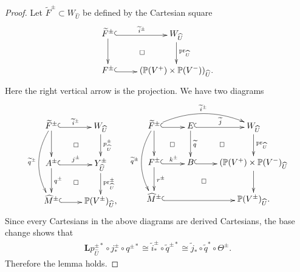 \documentclass[11pt]{amsart}
\theoremstyle{plain}
\newcommand{\dL}{\mathbf{L}}
\begin{document}
\begin{proof}
Let $\widetilde{F}^{\pm} \subset W_{\widehat{U}}$ be defined by
the Cartesian square
\begin{align}\notag
\xymatrix{
\widetilde{F}^{\pm} \ar@<-0.3ex>@{^{(}->}[r]^-{\widetilde{i}^{\pm}} \ar[d] 
\ar@{}[dr]|\square
& W_{\widehat{U}} \ar[d]^-{\mathrm{pr}_{\widehat{U}}} \\
F^{\pm} \ar@<-0.3ex>@{^{(}->}[r] & 
(\mathbb{P}(V^+) \times \mathbb{P}(V^-))_{\widehat{U}}.
}
\end{align}
Here the right vertical arrow is the projection. 
We have two diagrams
\begin{align}\notag
\xymatrix{
\widetilde{F}^{\pm} \ar@<-0.3ex>@{^{(}->}[r]^-{\widetilde{i}^{\pm}}
\ar@{}[dr]|\square
\ar[d] 
\ar@/_15pt/[dd]_-{\widetilde{q}^{\pm}} & W_{\widehat{U}} 
\ar[d]^-{p_{\widehat{U}}^{\pm}} \\
A^{\pm} \ar@<-0.3ex>@{^{(}->}[r]^-{j^{\pm}} \ar[d]^-{q^{\pm}} 
\ar@{}[dr]|\square
& Y_{\widehat{U}}^{\pm} \ar[d]^-{\mathrm{pr}_{\widehat{U}}^{\pm}} \\
\widehat{M}^{\pm}  \ar@<-0.3ex>@{^{(}->}[r] & \mathbb{P}(V^{\pm})_{\widehat{U}},
}
\quad
\xymatrix{
\widetilde{F}^{\pm} \ar@/_15pt/[dd]_-{\widetilde{q}^{\pm}}
\ar@/^15pt/[rr]^-{\widetilde{i}^{\pm}} 
 \ar@<-0.3ex>@{^{(}->}[r]  \ar[d] 
\ar@{}[dr]|\square &
E \ar@<-0.3ex>@{^{(}->}[r]^-{\widetilde{j}}  \ar[d]^-{\widetilde{q}}
\ar@{}[dr]|\square 
& W_{\widehat{U}} \ar[d]^-{\mathrm{pr}_{\widehat{U}}} \\
F^{\pm} \ar@<-0.3ex>@{^{(}->}[r]^-{k^{\pm}} \ar[d]^-{r^{\pm}}
\ar@{}[drr]|\square 
 &
B \ar@<-0.3ex>@{^{(}->}[r]
& 
(\mathbb{P}(V^+) \times \mathbb{P}(V^-)_{\widehat{U}} \ar[d] \\
\widehat{M}^{\pm}  \ar@<-0.3ex>@{^{(}->}[rr] & & 
\mathbb{P}(V^{\pm})_{\widehat{U}}.
}
\end{align}
Since every Cartesians in the above diagrams 
are derived Cartesians, the base change 
shows that 
\begin{align*}
\dL p_{\widehat{U}}^{\pm \ast} \circ j_{\ast}^{\pm} \circ q^{\pm \ast}
\cong \widetilde{i}^{\pm}_{\ast} \circ 
\widetilde{q}^{\pm \ast} \cong 
\widetilde{j}_{\ast} \circ \widetilde{q}^{\ast} \circ \Theta^{\pm}.
\end{align*}
Therefore
the lemma holds. 
\end{proof}
\end{document}
